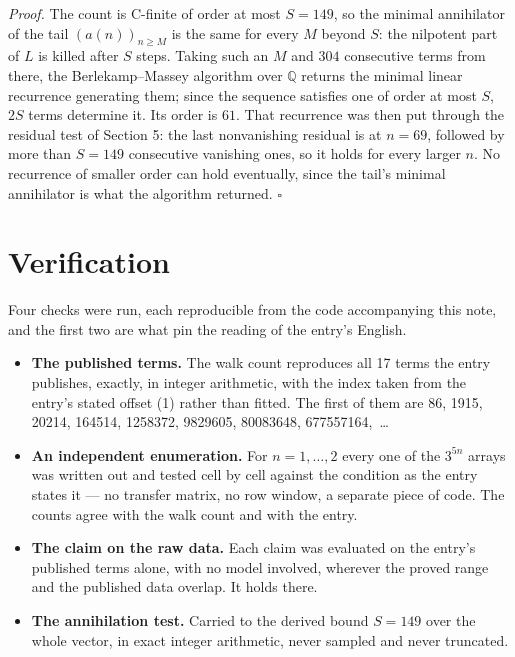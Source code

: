 \documentclass[11pt]{article}
\theoremstyle{definition}
\begin{document}
{\itshape Proof.} The count is C-finite of order at most $S = 149$, so the minimal annihilator of the tail $(a(n))_{n \ge M}$ is the same for every $M$ beyond $S$: the nilpotent part of $L$ is killed after $S$ steps. Taking such an $M$ and $304$ consecutive terms from there, the Berlekamp--Massey algorithm over $\mathbb{Q}$ returns the minimal linear recurrence generating them; since the sequence satisfies one of order at most $S$, $2S$ terms determine it. Its order is $61$. That recurrence was then put through the residual test of Section 5: the last nonvanishing residual is at $n = 69$, followed by more than $S = 149$ consecutive vanishing ones, so it holds for every larger $n$. No recurrence of smaller order can hold eventually, since the tail's minimal annihilator is what the algorithm returned. $\square$

\section{Verification}

Four checks were run, each reproducible from the code accompanying this note, and the first two are what pin the reading of the entry's English.

\begin{itemize}

\item {\bfseries The published terms.} The walk count reproduces all 17 terms the entry publishes, exactly, in integer arithmetic, with the index taken from the entry's stated offset (1) rather than fitted. The first of them are 86, 1915, 20214, 164514, 1258372, 9829605, 80083648, 677557164,~\dots

\item {\bfseries An independent enumeration.} For $n = 1,\dots,2$ every one of the $3^{5n}$ arrays was written out and tested cell by cell against the condition as the entry states it --- no transfer matrix, no row window, a separate piece of code. The counts agree with the walk count and with the entry.

\item {\bfseries The claim on the raw data.} Each claim was evaluated on the entry's published terms alone, with no model involved, wherever the proved range and the published data overlap. It holds there.

\item {\bfseries The annihilation test.} Carried to the derived bound $S = 149$ over the whole vector, in exact integer arithmetic, never sampled and never truncated.

\end{itemize}
\end{document}
